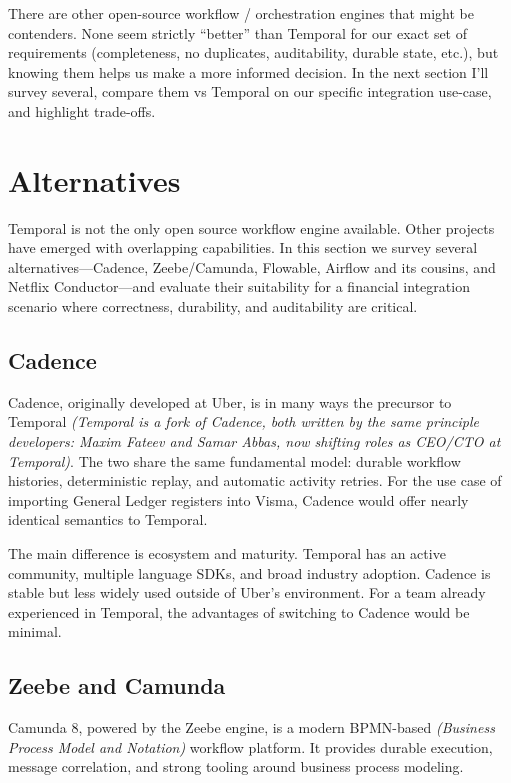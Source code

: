 \documentclass[11pt, a4paper, twocolumn]{article} %
\begin{document}
There are other open-source workflow / orchestration engines that might be contenders. None seem strictly ``better'' than Temporal for our exact set of requirements (completeness, no duplicates, auditability, durable state, etc.), but knowing them helps us make a more informed decision. In the next section I’ll survey several, compare them vs Temporal on our specific integration use-case, and highlight trade-offs.

\newpage

\section*{Alternatives}

Temporal is not the only open source workflow engine available. 
Other projects have emerged with overlapping capabilities. 
In this section we survey several alternatives---Cadence, Zeebe/Camunda, 
Flowable, Airflow and its cousins, and Netflix Conductor---and evaluate 
their suitability for a financial integration scenario where correctness, 
durability, and auditability are critical.

\subsection*{Cadence}

Cadence, originally developed at Uber, is in many ways the precursor to Temporal \textit{(Temporal is a fork of Cadence, both written by the same principle developers: Maxim Fateev and Samar Abbas, now shifting roles as CEO/CTO at Temporal)}. The two share the same fundamental model: durable workflow histories, deterministic replay, and automatic activity retries. For the use case of importing General Ledger registers into Visma, Cadence would offer nearly identical semantics to Temporal.

The main difference is ecosystem and maturity. Temporal has an active community, multiple language SDKs, and broad industry adoption. Cadence is stable but less widely used outside of Uber's environment. For a team already experienced in Temporal, the advantages of switching to Cadence would be minimal.

\subsection*{Zeebe and Camunda}

Camunda 8, powered by the Zeebe engine, is a modern BPMN-based \textit{(Business Process Model and Notation)} workflow platform. It provides durable execution, message correlation, and strong tooling around business process modeling.
\end{document}
